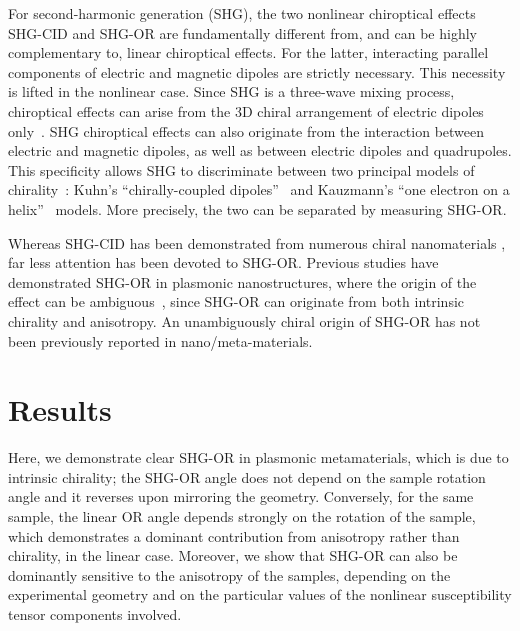 For second-harmonic generation (SHG), the two nonlinear chiroptical effects SHG-CID and SHG-OR are fundamentally different from, and can be highly complementary to, linear chiroptical effects. For the latter, interacting parallel components of electric and magnetic dipoles are strictly necessary. This necessity is lifted in the nonlinear case. Since SHG is a three-wave mixing process, chiroptical effects can arise from the 3D chiral arrangement of electric dipoles only~\cite{verbiest2009second}. 
SHG chiroptical effects can also originate from the interaction between electric and magnetic dipoles, as well as between electric dipoles and quadrupoles. This specificity allows SHG to discriminate between two principal models of chirality~\cite{Fischer2005a}: Kuhn's ``chirally-coupled dipoles''~\cite{Kuhn1930} and Kauzmann's ``one electron on a helix''~\cite{Maki1996, Kauzmann1957a} models. More precisely, the two can be separated by measuring SHG-OR. 

Whereas SHG-CID has been demonstrated from numerous chiral nanomaterials \cite{Hooper2017, Mamonov2017, Chen2016, Kolkowski2015, Belardini2014}, far less attention has been devoted to SHG-OR. Previous studies have demonstrated SHG-OR in plasmonic nanostructures, where the origin of the effect can be ambiguous~\cite{Romain2017, Ren2012a, Mamonov2012}, since SHG-OR can originate from both intrinsic chirality and anisotropy. An unambiguously chiral origin of SHG-OR has not been previously reported in nano/meta-materials. 

\section{Results}\label{sec:results:OAinPlanarNanohelices:results}
Here, we demonstrate clear SHG-OR in plasmonic metamaterials, which is due to intrinsic chirality; the SHG-OR angle does not depend on the sample rotation angle and it reverses upon mirroring the geometry. Conversely, for the same sample, the linear OR angle depends strongly on the rotation of the sample, which demonstrates a dominant contribution from anisotropy rather than chirality, in the linear case. Moreover, we show that SHG-OR can also be dominantly sensitive to the anisotropy of the samples, depending on the experimental geometry and on the particular values of the nonlinear susceptibility tensor components involved. 

